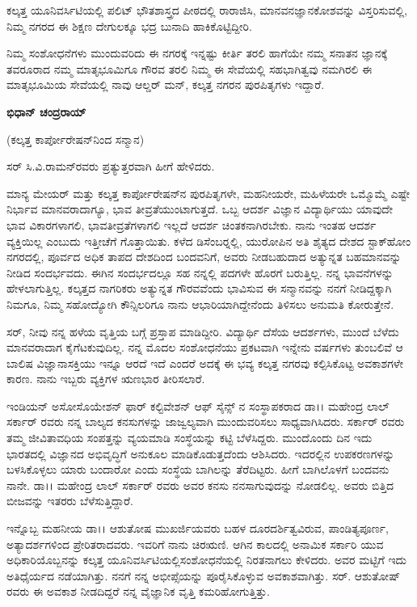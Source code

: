 ಕಲ್ಕತ್ತ ಯೂನಿವರ್ಸಿಟಿಯಲ್ಲಿ ಪಲಿಟ್ ಭೌತಶಾಸ್ತ್ರದ ಪೀಠದಲ್ಲಿ ರಾರಾಜಿಸಿ, ಮಾನವನ\break ಜ್ಞಾನಕೋಶವನ್ನು ವಿಸ್ತರಿಸುವಲ್ಲಿ, ನಿಮ್ಮ ನಗರದ ಈ ಶಿಕ್ಷಣ ದೇಗುಲಕ್ಕೂ ಭದ್ರ ಬುನಾದಿ ಹಾಕಿ\-ಕೊಟ್ಟಿದ್ದೀರಿ.

ನಿಮ್ಮ ಸಂಶೋಧನೆಗಳು ಮುಂದುವರಿದು ಈ ನಗರಕ್ಕೆ ಇನ್ನಷ್ಟು ಕೀರ್ತಿ ತರಲಿ ಹಾಗೆಯೇ ನಮ್ಮ ಸನಾತನ ಜ್ಞಾನಕ್ಕೆ ತವರೂರಾದ ನಮ್ಮ ಮಾತೃಭೂಮಿಗೂ ಗೌರವ ತರಲಿ ನಿಮ್ಮ ಈ ಸೇವೆಯಲ್ಲಿ ಸಹಭಾಗಿತ್ವವು ನಮಗಿರಲಿ ಈ ಮಾತೃಭೂಮಿಯ ಸೇವೆಯಲ್ಲಿ ನಾವು ಆಲ್ಡರ್ ಮನ್, ಕಲ್ಕತ್ತ ನಗರನ ಪುರಪಿತೃಗಳು ಇದ್ದಾರೆ.

\begin{flushright}
\textbf{ಭಿಧಾನ್ ಚಂದ್ರರಾಯ್}
\end{flushright}

(ಕಲ್ಕತ್ತ ಕಾರ್ಪೋರೇಷನ್‍ನಿಂದ ಸನ್ಮಾನ)

ಸರ್ ಸಿ.ವಿ.ರಾಮನ್‍ರವರು ಪ್ರತ್ಯುತ್ತರವಾಗಿ ಹೀಗೆ ಹೇಳಿದರು.

ಮಾನ್ಯ ಮೇಯರ್ ಮತ್ತು ಕಲ್ಕತ್ತ ಕಾರ್ಪೋರೇಷನ್‍ನ ಪುರಪಿತೃಗಳೇ, ಮಹನೀಯರೇ, ಮಹಿಳೆಯರೇ ಒಮ್ಮೊಮ್ಮೆ ಎಷ್ಟೇ ನಿರ್ಭಾವ ಮಾನವರಾದಾಗ್ಯೂ, ಭಾವ ತೀವ್ರತೆಯುಂಟಾಗುತ್ತದೆ. ಒಬ್ಬ ಆದರ್ಶ ವಿಜ್ಞಾನ ವಿದ್ಯಾರ್ಥಿಯು ಯಾವುದೇ ಭಾವ ವಿಕಾರಗಳಾಗಲಿ, ಭಾವತೀವ್ರತೆಗಳಾಗಲಿ ಇಲ್ಲದೆ ಆದರ್ಶ ಚಿಂತಕನಾಗಿರಬೇಕು. ನಾನು ಇಂತಹ ಆದರ್ಶ ವ್ಯಕ್ತಿಯಿಲ್ಲ ಎಂಬುದು ಇತ್ತೀಚೆಗೆ ಗೊತ್ತಾಯಿತು. ಕಳೆದ ಡಿಸೆಂಬರ್‍ನಲ್ಲಿ, ಯುರೋಪಿನ ಅತಿ ಶೈತ್ಯದ ದೇಶದ ಸ್ಟಾಕ್‍ಹೋಂ ನಗರದಲ್ಲಿ, ಪೂರ್ವದ ಅಧಿಕ ತಾಪದ ದೇಶದಿಂದ ಬಂದವನಿಗೆ, ಅವರು ನೀಡಬಹುದಾದ ಅತ್ಯುನ್ನತ ಬಹಮಾನವನ್ನು ನೀಡಿದ ಸಂದರ್ಭವದು. ಈಗಿನ ಸಂದರ್ಭದಲ್ಲೂ ಸಹ ನನ್ನಲ್ಲಿ ಪದಗಳೇ ಹೊರಗೆ ಬರುತ್ತಿಲ್ಲ. ನನ್ನ ಭಾವನೆಗಳನ್ನು ಹೇಳಲಾಗುತ್ತಿಲ್ಲ. ಕಲ್ಕತ್ತದ ನಾಗರಿಕರು ಅತ್ಯುನ್ನತ ಗೌರವವೆಂದು ಭಾವಿಸುವ ಈ ಸನ್ಮಾನವನ್ನು ನನಗೆ ನೀಡಿದ್ದಕ್ಕಾಗಿ ನಿಮಗೂ, ನಿಮ್ಮ ಸಹೋದ್ಯೋಗಿ ಕೌನ್ಸಿಲರಿಗೂ ನಾನು ಆಭಾರಿಯಾಗಿದ್ದೇನೆಂದು ತಿಳಿಸಲು ಅನುಮತಿ ಕೋರುತ್ತೇನೆ.

ಸರ್, ನೀವು ನನ್ನ ಹಳೆಯ ವೃತ್ತಿಯ ಬಗ್ಗೆ ಪ್ರಸ್ತಾಪ ಮಾಡಿದ್ದೀರಿ. ವಿದ್ಯಾರ್ಥಿ ದೆಸೆಯ ಆದರ್ಶಗಳು, ಮುಂದೆ ಬೆಳೆದು ಮಾನವರಾದಾಗ ಕೈಗೆಟಕುವುದಿಲ್ಲ. ನನ್ನ ಮೊದಲ ಸಂಶೋಧನೆಯು ಪ್ರಕಟವಾಗಿ ಇನ್ನೇನು  ವರ್ಷಗಳು ತುಂಬಲಿವೆ ಆ ಬಾಲಿಷ ವಿಜ್ಞಾನಾಸಕ್ತಿಯು ಇನ್ನೂ ಆರದೆ ಇದೆ ಎಂದರೆ ಅದಕ್ಕೆ ಈ ಭವ್ಯ ಕಲ್ಕತ್ತ ನಗರವು ಕಲ್ಪಿಸಿಕೊಟ್ಟ ಅವಕಾಶಗಳೇ ಕಾರಣ. ನಾನು ಇಬ್ಬರು ವ್ಯಕ್ತಿಗಳ ಋಣಭಾರ ತೀರಿಸಲಾರೆ.

ಇಂಡಿಯನ್ ಅಸೋಸೊಯೇಶನ್ ಫಾರ್ ಕಲ್ಟಿವೇಶನ್ ಆಫ್ ಸೈನ್ಸ್ ನ ಸಂಸ್ಥಾಪಕರಾದ ಡಾ।। ಮಹೇಂದ್ರ ಲಾಲ್ ಸರ್ಕಾರ್ ರವರು ನನ್ನ ಬಾಲ್ಯದ ಕನಸುಗಳನ್ನು ಜಾಜ್ವಲ್ಯವಾಗಿ ಮುಂದುವರಿಸಲು ಸಾಧ್ಯವಾಗಿಸಿದರು. ಸರ್ಕಾರ್ ರವರು ತಮ್ಮ ಜೀವಿತಾವಧಿಯ ಸಂಪತ್ತನ್ನು ವ್ಯಯಮಾಡಿ ಸಂಸ್ಥೆಯನ್ನು ಕಟ್ಟಿ ಬೆಳೆಸಿದ್ದರು. ಮುಂದೊಂದು ದಿನ ಇದು ಭಾರತದಲ್ಲಿ ವಿಜ್ಞಾನದ ಅಭಿವೃದ್ಧಿಗೆ ಅನುಕೂಲ ಮಾಡಿಕೊಡುತ್ತದೆಂದು ಆಶಿಸಿದರು. ಇದರಲ್ಲಿನ ಉಪಕರಣಗಳನ್ನು ಬಳಸಿಕೊಳ್ಳಲು ಯಾರು ಬಂದಾರೋ ಎಂದು ಸಂಸ್ಥೆಯ ಬಾಗಿಲನ್ನು ತೆರೆದಿಟ್ಟರು. ಹೀಗೆ ಬಾಗಿಲೊಳಗೆ ಬಂದವನು ನಾನೇ. ಡಾ।। ಮಹೇಂದ್ರ ಲಾಲ್ ಸರ್ಕಾರ್ ರವರು ಅವರ ಕನಸು ನನಸಾಗುವುದನ್ನು ನೋಡಲಿಲ್ಲ. ಅವರು ಬಿತ್ತಿದ ಬೀಜವನ್ನು ಇತರರು ಬೆಳೆಸುತ್ತಿದ್ದಾರೆ.

ಇನ್ನೊಬ್ಬ ಮಹನೀಯ ಡಾ।। ಆಶುತೋಷ ಮುಖರ್ಜಿಯವರು ಬಹಳ ದೂರದರ್ಶಿತ್ವವಿರುವ, ಪಾಂಡಿತ್ಯಪೂರ್ಣ, ಅತ್ಯಾದರ್ಶಗಳಿಂದ ಪ್ರೇರಿತರಾದವರು. ಇವರಿಗೆ ನಾನು ಚಿರಋಣಿ. ಆಗಿನ ಕಾಲದಲ್ಲಿ ಅನಾಮಿಕ ಸರ್ಕಾರಿ ಯುವ ಅಧಿಕಾರಿಯೊಬ್ಬನನ್ನು ಕಲ್ಕತ್ತ ಯೂನಿವರ್ಸಿಟಿಯಲ್ಲಿ\break ಸಂಶೋಧನೆಯಲ್ಲಿ ನಿರತನಾಗಲು ಕೇಳಿದರು. ಅವರ ಮಟ್ಟಿಗೆ ಇದು ಅತಿಧೈರ್ಯದ ನಡೆಯಾಗಿತ್ತು. ನನಗೆ ನನ್ನ ಅಭೀಪ್ಸೆಯನ್ನು ಪೂರೈಸಿಕೊಳ್ಳುವ ಅವಕಾಶವಾಗಿತ್ತು. ಸರ್. ಆಶುತೋಷ್ ರವರು ಈ ಅವಕಾಶ ನೀಡದಿದ್ದರೆ ನನ್ನ ವೈಜ್ಞಾನಿಕ ವೃತ್ತಿ ಕಮರಿಹೋಗುತ್ತಿತ್ತು.

